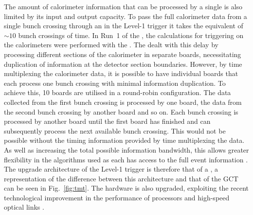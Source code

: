 The amount of calorimeter information that can be processed by a
single \FPGA is also limited by its input and output capacity. To pass
the full calorimeter data from a single bunch crossing through an
\FPGA in the Level-1 trigger it takes the equivalent of $\sim10$ bunch
crossings of time. In Run~1 of the \LHC, the calculations for
triggering on the calorimeters were performed with the \GCT
\cite{Khachatryan:2016bia}. The \GCT dealt with this delay by
processing different sections of the calorimeter in separate boards,
necessitating duplication of information at the detector section
boundaries. However, by time multiplexing the calorimeter data, it is
possible to have individual \FPGA boards that each process one bunch
crossing with minimal information duplication. To achieve this, 10
\FPGA boards are utilised in a round-robin configuration. The data
collected from the first bunch crossing is processed by one board, the
data from the second bunch crossing by another board and so on. Each
bunch crossing is processed by another board until the first board has
finished and can subsequently process the next available bunch
crossing. This would not be possible without the timing information
provided by time multiplexing the data. As well as increasing the
total possible information bandwidth, this allows greater flexibility
in the algorithms used as each \FPGA has access to the full event
information \cite{1748-0221-9-10-C10034,1748-0221-7-01-C01060}. The
upgrade architecture of the Level-1 trigger is therefore that of a
\TMT, a representation of the difference between this architecture and
that of the \ac{GCT} can be seen in Fig.~\ref{fig:tmt}. The hardware
is also upgraded, exploiting the recent technological improvement in
the performance of \FPGA processors and high-speed optical links
\cite{tp}.

